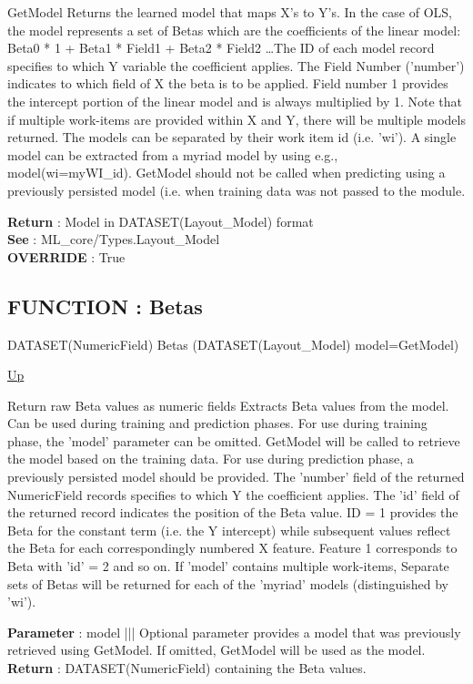 \par
GetModel Returns the learned model that maps X's to Y's. In the case of OLS, the model represents a set of Betas which are the coefficients of the linear model: Beta0 * 1 + Beta1 * Field1 + Beta2 * Field2 \ldots The ID of each model record specifies to which Y variable the coefficient applies. The Field Number ('number') indicates to which field of X the beta is to be applied. Field number 1 provides the intercept portion of the linear model and is always multiplied by 1. Note that if multiple work-items are provided within X and Y, there will be multiple models returned. The models can be separated by their work item id (i.e. 'wi'). A single model can be extracted from a myriad model by using e.g., model(wi=myWI\_id). GetModel should not be called when predicting using a previously persisted model (i.e. when training data was not passed to the module.
\par
\textbf{Return} : Model in DATASET(Layout\_Model) format \\
\textbf{See} : ML\_core/Types.Layout\_Model \\
\textbf{OVERRIDE} : True \\
\subsection*{FUNCTION : Betas}
\hypertarget{ecldoc:linearregression.ols.betas}{}
\begin{minipage}[t]{\textwidth}
\begin{flushleft}
DATASET(NumericField) Betas (DATASET(Layout\_Model) model=GetModel)
\end{flushleft}
\end{minipage}
\hyperlink{ecldoc:linearregression.ols}{Up}

\par
Return raw Beta values as numeric fields Extracts Beta values from the model. Can be used during training and prediction phases. For use during training phase, the 'model' parameter can be omitted. GetModel will be called to retrieve the model based on the training data. For use during prediction phase, a previously persisted model should be provided. The 'number' field of the returned NumericField records specifies to which Y the coefficient applies. The 'id' field of the returned record indicates the position of the Beta value. ID = 1 provides the Beta for the constant term (i.e. the Y intercept) while subsequent values reflect the Beta for each correspondingly numbered X feature. Feature 1 corresponds to Beta with 'id' = 2 and so on. If 'model' contains multiple work-items, Separate sets of Betas will be returned for each of the 'myriad' models (distinguished by 'wi').
\par
\textbf{Parameter} : model ||| Optional parameter provides a model that was previously retrieved using GetModel. If omitted, GetModel will be used as the model. \\
\textbf{Return} : DATASET(NumericField) containing the Beta values. \\
